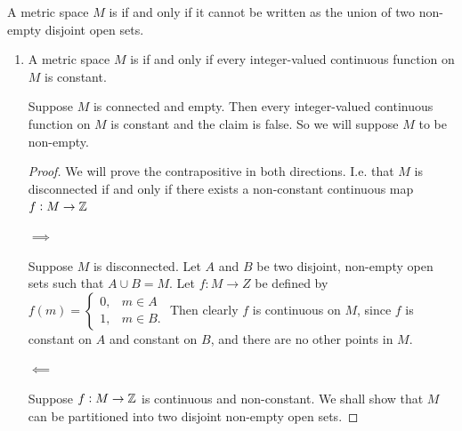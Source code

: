 \documentclass[12pt]{article}
\begin{document}
\begin{definition*}
  A metric space $M$ is  if and only if it cannot be written as the union of two
  non-empty disjoint open sets.
\end{definition*}


\begin{enumerate}[label=(\roman*)]
\item
  \begin{claim*}
    A metric space $M$ is  if and only if every integer-valued continuous function
    on $M$ is constant.
  \end{claim*}
  \begin{remark*}
    Suppose $M$ is connected and empty. Then every integer-valued continuous function on $M$ is
    constant and the claim is false. So we will suppose $M$ to be non-empty.
  \end{remark*}
  \begin{proof}

    We will prove the contrapositive in both directions. I.e. that $M$ is disconnected if and only
    if there exists a non-constant continuous map $f:M \to \mathbb{Z}$

    $\implies$

    Suppose $M$ is disconnected. Let $A$ and $B$ be two disjoint, non-empty open sets such that
    $A \cup B = M$. Let $f:M \to Z$ be defined by $f(m) =
    \begin{cases}
      0, & m \in A\\
      1, & m \in B.
    \end{cases}$ Then clearly  $f$ is continuous on $M$,
    since $f$ is constant on $A$ and constant on $B$, and there are no other points in $M$.

    $\impliedby$

    Suppose $f:M \to \mathbb{Z}$ is continuous and non-constant. We shall show that $M$ can be partitioned
    into two disjoint non-empty open sets.


\end{proof}
\end{enumerate}
\end{document}
